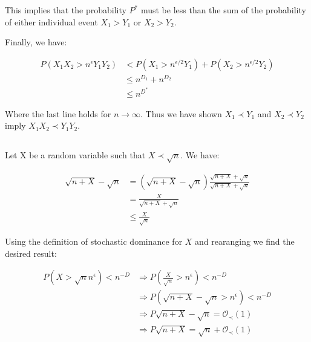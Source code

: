 \documentclass{article}
\begin{document}
This implies that the probability $P^*$ must be less than the sum of the probability of either individual event $X_1>Y_1$ or $X_2>Y_2$.

Finally, we have:

\begin{equation}
	\begin{split}
		P\left(X_1X_2>n^\epsilon Y_1Y_2\right) &< P(X_1>n^{\epsilon/2}Y_1)+ P(X_2>n^{\epsilon/2}Y_2) \\
						       &\leq n^{D_1} + n^{D_2} \\
						       &\leq n^{D^*} 
	\end{split}
\end{equation}

Where the last line holds for $n\rightarrow\infty$. Thus we have shown $X_1\prec Y_1$ and $X_2\prec Y_2$ imply $X_1X_2 \prec Y_1Y_2$. 


\subsection{}

Let X be a random variable such that $X\prec \sqrt{n}$. We have:

\begin{equation}
	\begin{split}
		\sqrt{n + X} - \sqrt{n}  &= \left( \sqrt{n + X} - \sqrt{n}   \right)\frac{\sqrt{n+X} +\sqrt{n}}{\sqrt{n+X} +\sqrt{n}} \\
					 &=\frac{X}{\sqrt{n+X} +\sqrt{n}} \\
					 &\leq \frac{X}{\sqrt{n}}
	\end{split}
\end{equation}

Using the definition of stochastic dominance for $X$ and rearanging we find the desired result:

\begin{equation}
\begin{split}
	P \left( X>\sqrt{n}n^\epsilon \right) <n^{-D} &\Rightarrow P \left( \frac{X}{\sqrt{n}}>n^\epsilon \right) <n^{-D} \\
	&\Rightarrow P \left( \sqrt{n + X} - \sqrt{n}  >n^\epsilon \right) <n^{-D} \\
	&\Rightarrow P \sqrt{n + X} - \sqrt{n} = \mathcal{O}_\prec \left( 1 \right)  \\ 
	&\Rightarrow P \sqrt{n + X} = \sqrt{n}  +\mathcal{O}_\prec \left( 1 \right) 
\end{split}
\end{equation}
\end{document}
